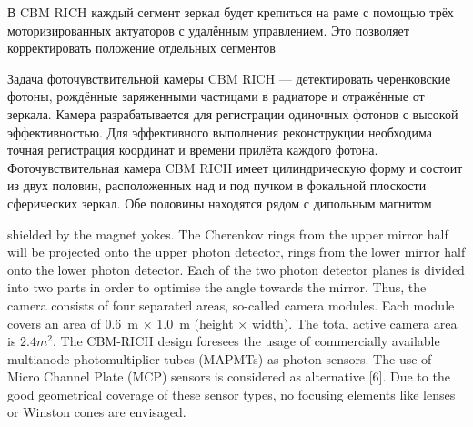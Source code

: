 
В CBM RICH каждый сегмент зеркал будет крепиться на раме с помощью трёх \todo моторизированных актуаторов с удалённым управлением. Это позволяет корректировать положение отдельных сегментов 


Задача фоточувствительной камеры CBM RICH --- детектировать черенковские фотоны, рождённые заряженными частицами в радиаторе и отражённые от зеркала. Камера разрабатывается для регистрации одиночных фотонов с высокой эффективностью. Для эффективного выполнения реконструкции необходима точная регистрация координат и времени прилёта каждого фотона.
Фоточувствительная камера CBM RICH имеет цилиндрическую форму и состоит из двух половин, расположенных над и под пучком в фокальной плоскости сферических зеркал. Обе половины находятся рядом с дипольным магнитом


shielded by the magnet yokes. The Cherenkov rings from the upper mirror half will be projected onto the upper photon detector, rings from the lower mirror half onto the lower photon detector. Each of the two photon detector planes is divided into two parts in order to optimise the angle towards the mirror. Thus, the camera consists of four separated areas, so-called camera modules. Each module covers an area of 0.6~m $\times$ 1.0~m (height $\times$ width). The total active camera area is $2.4 m^{2}$.
The CBM-RICH design foresees the usage of commercially available multianode photomultiplier tubes (MAPMTs) as photon sensors. The use of Micro Channel Plate (MCP) sensors is considered as alternative [6]. Due to the good geometrical coverage of these sensor types, no focusing elements like lenses or Winston cones are envisaged.

